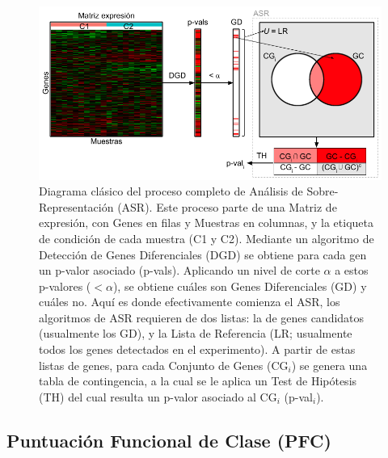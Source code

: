 \documentclass[12pt,twoside]{reedthesis}
\begin{document}
\newpage
\begin{figure}

{\centering \includegraphics[width=1\linewidth]{images/diagrama_ORA} 

}

\caption{Diagrama clásico del proceso completo de Análisis de Sobre-Representación (ASR). Este proceso parte de una Matriz de expresión, con Genes en filas y Muestras en columnas, y la etiqueta de condición de cada muestra (C1 y C2). Mediante un algoritmo de Detección de Genes Diferenciales (DGD) se obtiene para cada gen un p-valor asociado (p-vals). Aplicando un nivel de corte \(\alpha\) a estos p-valores (\(< \alpha\)), se obtiene cuáles son Genes Diferenciales (GD) y cuáles no. Aquí es donde efectivamente comienza el ASR, los algoritmos de ASR requieren de dos listas: la de genes candidatos (usualmente los GD), y la Lista de Referencia (LR; usualmente todos los genes detectados en el experimento). A partir de estas listas de genes, para cada Conjunto de Genes (CG\(_i\)) se genera una tabla de contingencia, a la cual se le aplica un Test de Hipótesis (TH) del cual resulta un p-valor asociado al CG\(_i\) (p-val\(_i\)).}\label{fig:diagramaORA}
\end{figure}


\hypertarget{puntuacion-funcional-de-clase-pfc}{%
\subsection{Puntuación Funcional de Clase (PFC)}\label{puntuacion-funcional-de-clase-pfc}}
\end{document}

